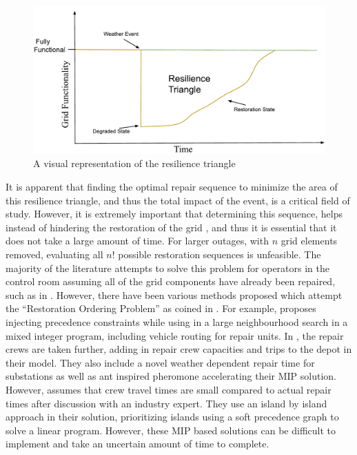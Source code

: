 \documentclass[12pt]{article}
\begin{document}
\begin{figure}[ht]
    \centering %
    \includegraphics[width=\textwidth]{Resilience Triangle.pdf}
    \caption[Resilience Triangle]{A visual representation of the resilience triangle}
    \label{fig:resiliencetriangle}
\end{figure}
It is apparent that finding the optimal repair sequence to minimize the area of this resilience triangle, and thus the total impact of the event, is a critical field of study. However, it is extremely important that determining this sequence, helps instead of hindering the restoration of the grid \cite{ancona},  and thus it is essential that it does not take a large amount of time. For larger outages, with $n$ grid elements removed, evaluating all $n!$ possible restoration sequences is unfeasible. The majority of the literature attempts to solve this problem for operators in the control room \cite{yan} assuming all of the grid components have already been repaired, such as in \cite{chen}\cite{thiebaux}.  However, there have been various methods proposed which attempt the “Restoration Ordering Problem” as coined in \cite{coffrin2012}. For example, \cite{coffrin2011} proposes injecting precedence constraints while using in a large neighbourhood search in a mixed integer program, including vehicle routing for repair units. In \cite{yan}, the repair crews are taken further, adding in repair crew capacities and trips to the depot in their model. They also include a novel weather dependent repair time for substations as well as ant inspired pheromone accelerating their MIP solution. However, \cite{tan} assumes that crew travel times are small compared to actual repair times after discussion with an industry expert. They use an island by island approach in their solution, prioritizing islands using a soft precedence graph to solve a linear program. However, these MIP based solutions can be difficult to implement and take an uncertain amount of time to complete. \par
\end{document}
